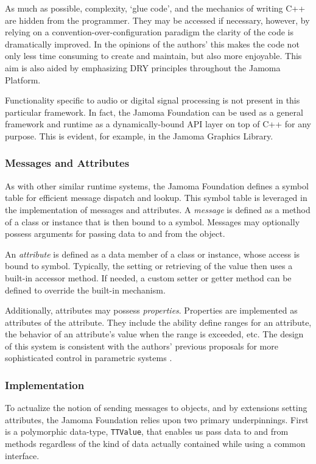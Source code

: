 \documentclass[twoside,10pt]{article}
\begin{document}
As much as possible, complexity, `glue code', and the mechanics of writing C++ are hidden from the programmer.  They may be accessed if necessary, however, by relying on a convention-over-configuration paradigm the clarity of the code is dramatically improved.  In the opinions of the authors' this makes the code not only less time consuming to create and maintain, but also more enjoyable.  This aim is also aided by emphasizing DRY principles throughout the Jamoma Platform.

Functionality specific to audio or digital signal processing is not present in this particular framework.  In fact, the Jamoma Foundation can be used as a general framework and runtime as a dynamically-bound API layer on top of C++ for any purpose.  This is evident, for example, in the Jamoma Graphics Library.

\subsubsection{Messages and Attributes} %

As with other similar runtime systems, the Jamoma Foundation defines a symbol table for efficient message dispatch and lookup.  This symbol table is leveraged in the implementation of messages and attributes.  
A \emph{message} is defined as a method of a class or instance that is then bound to a symbol.  Messages may optionally possess arguments for passing data to and from the object.

An \emph{attribute} is defined as a data member of a class or instance, whose access is bound to symbol.  Typically, the setting or retrieving of the value then uses a built-in accessor method.  If needed, a custom setter or getter method can be defined to override the built-in mechanism.

Additionally, attributes may possess \emph{properties}.  Properties are implemented as attributes of the attribute.  They include the ability define ranges for an attribute, the behavior of an attribute's value when the range is exceeded, etc.  The design of this system is consistent with the authors' previous proposals for more sophisticated control in parametric systems \cite{Place:2008params}.

\subsubsection{Implementation}

To actualize the notion of sending messages to objects, and by extensions setting attributes, the Jamoma Foundation relies upon two primary underpinnings.  First is a polymorphic data-type, \texttt{TTValue}, that enables us pass data to and from methods regardless of the kind of data actually contained while using a common interface.  %
\end{document}
